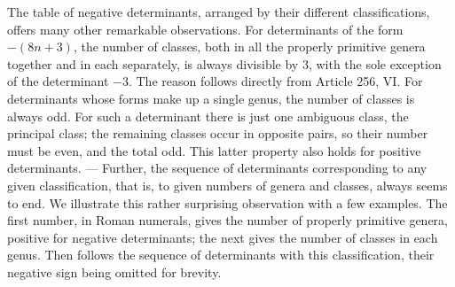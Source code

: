 The table of negative determinants, arranged by their different classifications, offers many other remarkable observations. For determinants of the form \(-(8n+3)\), the number of classes, both in all the properly primitive genera together and in each separately, is always divisible by \(3\), with the sole exception of the determinant \(-3\). The reason follows directly from Article 256, VI. For determinants whose forms make up a single genus, the number of classes is always odd. For such a determinant there is just one ambiguous class, the principal class; the remaining classes occur in opposite pairs, so their number must be even, and the total odd. This latter property also holds for positive determinants. — Further, the sequence of determinants corresponding to any given classification, that is, to given numbers of genera and classes, always seems to end. We illustrate this rather surprising observation with a few examples. The first number, in Roman numerals, gives the number of properly primitive genera, positive for negative determinants; the next gives the number of classes in each genus. Then follows the sequence of determinants with this classification, their negative sign being omitted for brevity.


